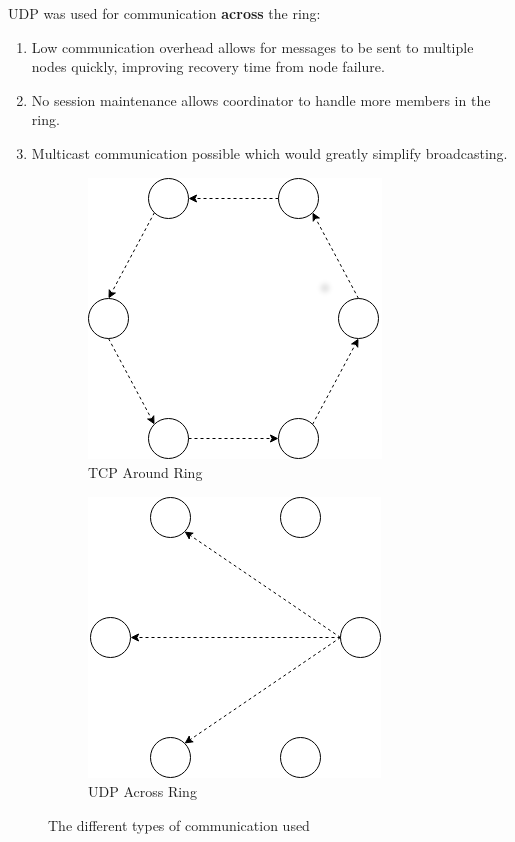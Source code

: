 \documentclass[12pt]{article}
\begin{document}
\noindent UDP was used for communication \textbf{across} the ring: 
\begin{enumerate}
    \item Low communication overhead allows for messages to be sent to multiple nodes quickly, improving recovery time from node failure.
    \item No session maintenance allows coordinator to handle more members in the ring.
    \item Multicast communication possible which would greatly simplify broadcasting.
\end{enumerate}

\begin{figure}[!h]
\centering
\begin{subfigure}{.5\textwidth}
  \centering
  \includegraphics[width=.6\linewidth]{images/tcp}
  \caption{TCP Around Ring}
  \label{fig:tcp}
\end{subfigure}%
\begin{subfigure}{.5\textwidth}
  \centering
  \includegraphics[width=.6\linewidth]{images/udp}
  \caption{UDP Across Ring}
  \label{fig:udp}
\end{subfigure}
\caption{The different types of communication used}
\label{fig:pattern}
\end{figure}
\end{document}
